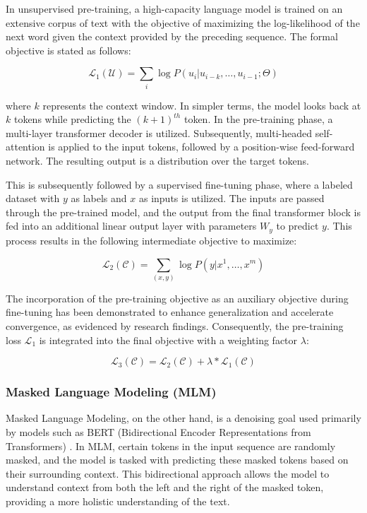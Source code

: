 In unsupervised pre-training, a high-capacity language model is trained on an extensive corpus of text with the objective of maximizing the log-likelihood of the next word given the context provided by the preceding sequence. The formal objective is stated as follows:

\begin{equation}
    \mathcal{L}_1(\mathcal{U}) = \sum_{i} \log P(u_i | u_{i-k}, \ldots, u_{i-1}; \Theta)
\end{equation}

where \( k \) represents the context window. In simpler terms, the model looks back at \( k \) tokens while predicting the \((k+1)^{th}\) token. In the pre-training phase, a multi-layer transformer decoder is utilized. Subsequently, multi-headed self-attention is applied to the input tokens, followed by a position-wise feed-forward network. The resulting output is a distribution over the target tokens.

This is subsequently followed by a supervised fine-tuning phase, where a labeled dataset with \( y \) as labels and \( x \) as inputs is utilized. The inputs are passed through the pre-trained model, and the output from the final transformer block is fed into an additional linear output layer with parameters \( W_y \) to predict \( y \). This process results in the following intermediate objective to maximize:

\begin{equation}
    \mathcal{L}_2(\mathcal{C}) = \sum_{(x,y)} \log P(y | x^1, \ldots, x^m)
\end{equation}

The incorporation of the pre-training objective as an auxiliary objective during fine-tuning has been demonstrated to enhance generalization and accelerate convergence, as evidenced by research findings. Consequently, the pre-training loss \( \mathcal{L}_1 \) is integrated into the final objective with a weighting factor \( \lambda \):

\begin{equation}
    \mathcal{L}_3(\mathcal{C}) = \mathcal{L}_2(\mathcal{C}) + \lambda \ast \mathcal{L}_1(\mathcal{C})
\end{equation}
 
\subsubsection{Masked Language Modeling (MLM)}

Masked Language Modeling, on the other hand, is a denoising goal used primarily by models such as BERT (Bidirectional Encoder Representations from Transformers) \cite{devlin2018bert}. In MLM, certain tokens in the input sequence are randomly masked, and the model is tasked with predicting these masked tokens based on their surrounding context. This bidirectional approach allows the model to understand context from both the left and the right of the masked token, providing a more holistic understanding of the text.

